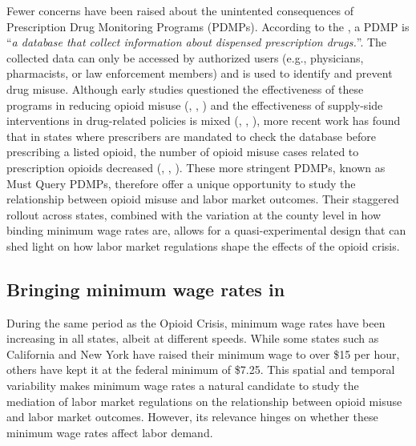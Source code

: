 \documentclass[12pt,a4paper]{article}
\begin{document}
Fewer concerns have been raised about the unintented consequences of Prescription Drug Monitoring Programs (PDMPs).
According to the \textcite{CDC2021}, a PDMP is ``\textit{a database that collect information about dispensed prescription drugs.}''.
The collected data can only be accessed by authorized users (e.g., physicians, pharmacists, or law enforcement members) and is used to identify and prevent drug misuse.
Although early studies questioned the effectiveness of these programs in reducing opioid misuse (\cite{Paulozzi2011}, \cite{Maughan2015}, \cite{Meara2016}) and the effectiveness of supply-side interventions in drug-related policies is mixed (\cite{Pollack2014}, \cite{Dobkin2019}, \cite{Dobkin2014}), more recent work has found that in states where prescribers are mandated to check the database before prescribing a listed opioid, the number of opioid misuse cases related to prescription opioids decreased (\cite{Buchmueller2018}, \cite{Sacks2021}, \cite{Grecu2019}).
These more stringent PDMPs, known as Must Query PDMPs, therefore offer a unique opportunity to study the relationship between opioid misuse and labor market outcomes.
Their staggered rollout across states, combined with the variation at the county level in how binding minimum wage rates are, allows for a quasi-experimental design that can shed light on how labor market regulations shape the effects of the opioid crisis.

\subsection*{Bringing minimum wage rates in}

During the same period as the Opioid Crisis, minimum wage rates have been increasing in all states, albeit at different speeds.
While some states such as California and New York have raised their minimum wage to over \$15 per hour, others have kept it at the federal minimum of \$7.25.
This spatial and temporal variability makes minimum wage rates a natural candidate to study the mediation of labor market regulations on the relationship between opioid misuse and labor market outcomes. 
However, its relevance hinges on whether these minimum wage rates affect labor demand.
\end{document}
